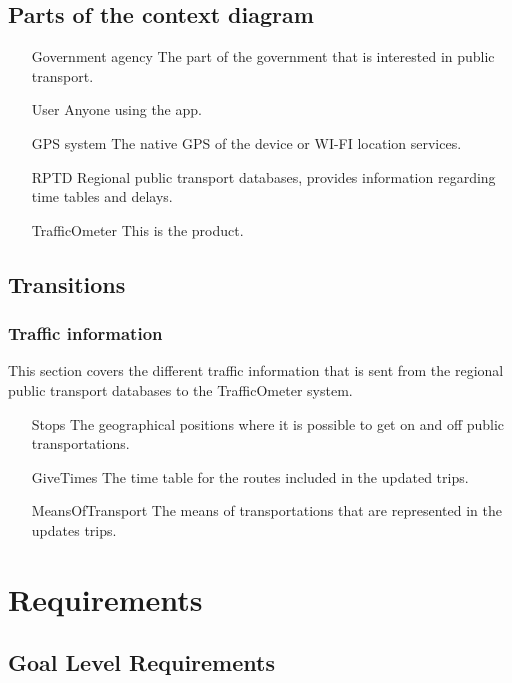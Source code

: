\documentclass[a4paper]{article}
\begin{document}
		\subsection{Parts of the context diagram} %
		\label{sub:parts_of_the_context_diagram}
			\begin{itemize}
				\item[Government agency] The part of the government that is interested in public transport. 
				\item[User] Anyone using the app.
				\item[GPS system] The native GPS of the device or WI-FI location services.
				\item[RPTD] Regional public transport databases, provides information regarding time tables and delays.
				\item[TrafficOmeter] This is the product.
			\end{itemize}

		\subsection{Transitions} %
		\label{sub:transitions}
			\subsubsection{Traffic information} %
			\label{ssub:traffic_information}
			This section covers the different traffic information that is sent from the regional public transport databases to the TrafficOmeter system.
			\begin{itemize}
				\item[Stops] The geographical positions where it is possible to get on and off public transportations.
				\item[GiveTimes] The time table for the routes included in the updated trips.
				\item[MeansOfTransport] The means of transportations that are represented in the updates trips.
			\end{itemize}
		
	
	
	\section{Requirements}
		\subsection{Goal Level Requirements}
			
\end{document}
